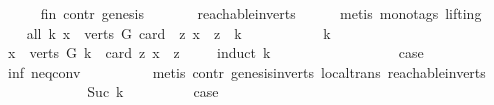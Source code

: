 \begin{isabellebody}
\ \ \ \ \isamarkupfalse%
\ fin\ contr\ genesis\ \isanewline
\ \ \ \ \ \ reachable{}{\isacharunderscore}{\kern0pt}in{\isacharunderscore}{\kern0pt}verts{\isacharparenleft}{\kern0pt}{}{\isacharparenright}{\kern0pt}\isanewline
\ \ \ \ \isamarkupfalse%
\ {\isacharparenleft}{\kern0pt}metis\ {\isacharparenleft}{\kern0pt}mono{\isacharunderscore}{\kern0pt}tags{\isacharcomma}{\kern0pt}\ lifting{\isacharparenright}{\kern0pt}{\isacharparenright}{\kern0pt}\ \isanewline
\ \ \isamarkupfalse%
\ all{\isacharcolon}{\kern0pt}\ {\isachardoublequoteopen}{\isasymforall}k{\isachardot}{\kern0pt}\ {\isasymexists}x\ {\isasymin}\ verts\ G{\isachardot}{\kern0pt}\ card\ \ {\isacharbraceleft}{\kern0pt}z{\isachardot}{\kern0pt}\ x\ {\isasymrightarrow}\isactrlsup {\isacharplus}{\kern0pt}\ z{\isacharbraceright}{\kern0pt}\ {\isachargreater}{\kern0pt}\ k{\isachardoublequoteclose}\ \isanewline
\ \ \isamarkupfalse%
\ \isanewline
\ \ \ \ \isamarkupfalse%
\ k\ \isanewline
\ \ \ \ \isamarkupfalse%
\ {\isachardoublequoteopen}{\isasymexists}x\ {\isasymin}\ verts\ G{\isachardot}{\kern0pt}\ k\ {\isacharless}{\kern0pt}\ card\ {\isacharbraceleft}{\kern0pt}z{\isachardot}{\kern0pt}\ x\ {\isasymrightarrow}\isactrlsup {\isacharplus}{\kern0pt}\ z{\isacharbraceright}{\kern0pt}{\isachardoublequoteclose}\isanewline
\ \ \ \ \isamarkupfalse%
{\isacharparenleft}{\kern0pt}induct\ k{\isacharparenright}{\kern0pt}\isanewline
\ \ \ \ \ \ \isamarkupfalse%
\ {}\isanewline
\ \ \ \ \ \ \isamarkupfalse%
\ \isamarkupfalse%
\ {\isacharquery}{\kern0pt}case\isanewline
\ \ \ \ \ \ \ \ \isamarkupfalse%
\ inf\ neq{}{\isacharunderscore}{\kern0pt}conv\isanewline
\ \ \ \ \ \ \ \ \isamarkupfalse%
\ {\isacharparenleft}{\kern0pt}metis\ contr\ genesis{\isacharunderscore}{\kern0pt}in{\isacharunderscore}{\kern0pt}verts\ local{\isachardot}{\kern0pt}trans\ reachable{}{\isacharunderscore}{\kern0pt}in{\isacharunderscore}{\kern0pt}verts{\isacharparenleft}{\kern0pt}{}{\isacharparenright}{\kern0pt}{\isacharparenright}{\kern0pt}\ \isanewline
\ \ \ \ \isamarkupfalse%
\isanewline
\ \ \ \ \ \ \isamarkupfalse%
\ {\isacharparenleft}{\kern0pt}Suc\ k{\isacharparenright}{\kern0pt}\isanewline
\ \ \ \ \ \ \isamarkupfalse%
\ \isamarkupfalse%
\ {\isacharquery}{\kern0pt}case\isanewline
\ \ \ \ \ \ \ \ \isamarkupfalse%

\end{isabellebody}
